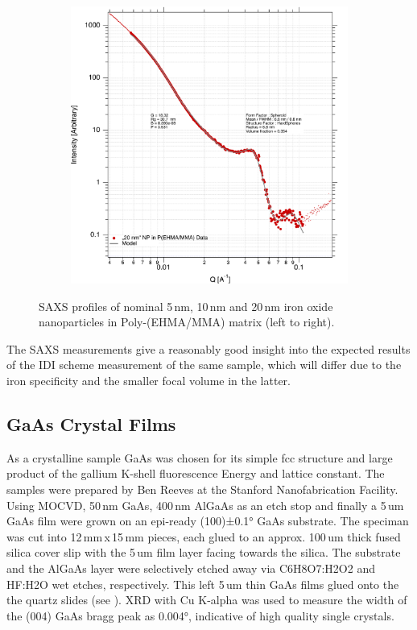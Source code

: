 \begin{figure}[tp]
\begin{subfigure}[b]{0.3\textwidth}
	\end{subfigure}
	\begin{subfigure}[b]{0.3\textwidth}
		\includegraphics[width=\linewidth]{images/pmma20.pdf}
	\end{subfigure}
	
	\caption[SAXS profile of iron oxide nanoparticles in  Poly-(EHMA/MMA) matrix]{SAXS profiles of nominal 5\,nm, 10\,nm and 20\,nm iron oxide nanoparticles in Poly-(EHMA/MMA) matrix (left to right).}
	\label{fig:saxspmma}
\end{figure}

The SAXS measurements give a reasonably good insight into the expected results of the IDI scheme measurement of the same sample, which will differ due to the iron specificity and the smaller focal volume in the latter.  

\subsection{GaAs Crystal Films}
As a crystalline sample GaAs was chosen for its simple fcc structure and large product of the gallium K-shell fluorescence Energy and lattice constant. The samples were prepared by Ben Reeves at the Stanford Nanofabrication Facility. 
Using MOCVD, 50\,nm GaAs, 400\,nm AlGaAs as an etch stop and finally a 5\,um GaAs film were grown on an epi-ready (100)±0.1° GaAs substrate. The speciman was cut into 12\,mm\,x\,15\,mm pieces, each glued to an approx. 100\,um thick fused silica cover slip with the 5\,um film layer facing towards the silica. The substrate and the AlGaAs layer were selectively etched away via C6H8O7:H2O2 and HF:H2O wet etches, respectively. This left 5\,um thin GaAs films glued onto the the quartz slides (see ).  XRD with Cu K-alpha was used to measure the width of the (004) GaAs bragg peak as 0.004°, indicative of high quality single crystals. 

